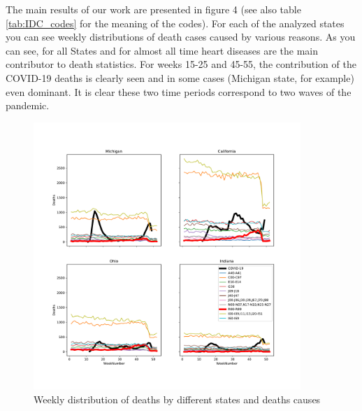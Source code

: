 \documentclass[conference]{IEEEtran}
\begin{document}
The main results of our work are presented in figure 4 (see also table \ref{tab:IDC_codes} for the meaning of the codes). For each of the analyzed states you can see weekly distributions of death cases caused by various reasons. As you can see, for all States and for almost all time heart diseases are the main contributor to death statistics. For weeks 15-25 and 45-55, the contribution of the COVID-19 deaths is clearly seen and in some cases (Michigan state, for example) even dominant. It is clear these two time periods correspond to two waves of the pandemic.


\begin{figure}
  \centering
  \includegraphics[width=0.9\textwidth]{figs/weekly_deaths}
  \caption{Weekly distribution of deaths by different states and deaths causes}
  \label{fig:weekly_deaths}
\end{figure}
\end{document}
